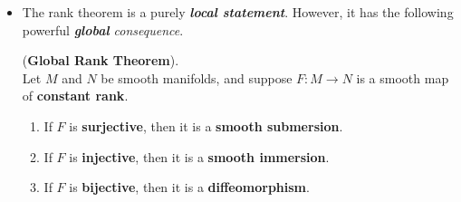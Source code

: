 \documentclass[11pt]{article}
\begin{document}
\begin{itemize}
\item The rank theorem is a purely \emph{\textbf{local statement}}. However, it has the following powerful \emph{\textbf{global} consequence}.
\begin{theorem} (\textbf{Global Rank Theorem}). \citep{lee2003introduction}\\
Let $M$ and $N$ be smooth manifolds, and suppose $F: M \rightarrow N$ is a smooth map of \textbf{constant rank}.
\begin{enumerate}
\item If $F$ is \textbf{surjective}, then it is a \textbf{smooth submersion}.
\item If $F$ is \textbf{injective}, then it is a \textbf{smooth immersion}.
\item If $F$ is \textbf{bijective}, then it is a \textbf{diffeomorphism}.
\end{enumerate}
\end{theorem}
\end{itemize}
\end{document}
